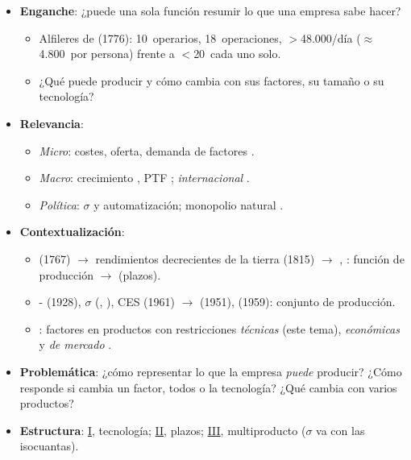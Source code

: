 \documentclass{article}
\begin{document}
\cabecerarepaso
\begin{columnas}

\begin{itemize}
\item \textbf{Enganche}: ¿puede una sola función resumir lo que una empresa sabe hacer?
  \begin{itemize}
  \item Alfileres de  (1776): 10~operarios, 18~operaciones, $>$48.000/día ($\approx$4.800~por persona) frente a $<$20~cada uno solo.
  \item ¿Qué puede producir y cómo cambia con sus factores, su tamaño o su tecnología?
  \end{itemize}
\item \textbf{Relevancia}:
  \begin{itemize}
  \item \emph{Micro}: costes, oferta, demanda de factores  .
  \item \emph{Macro}: crecimiento , PTF ; \emph{internacional}  .
  \item \emph{Política}: $\sigma$ y automatización; monopolio natural .
  \end{itemize}
\item \textbf{Contextualización}:
  \begin{itemize}
  \item {} (1767) $\to$ rendimientos decrecientes de la tierra (1815) $\to$ , : función de producción $\to$  (plazos).
  \item {}- (1928), $\sigma$ (, ), CES (1961) $\to$  (1951),  (1959): conjunto de producción.
  \item {}: factores en productos con restricciones \emph{técnicas} (este tema), \emph{económicas}  y \emph{de mercado} .
  \end{itemize}
\item \textbf{Problemática}: ¿cómo representar lo que la empresa \emph{puede} producir? ¿Cómo responde si cambia un factor, todos o la tecnología? ¿Qué cambia con varios productos?
\item \textbf{Estructura}: \hyperref[rep:I]{I}, tecnología; \hyperref[rep:II]{II}, plazos; \hyperref[rep:III]{III}, multiproducto ($\sigma$ va con las isocuantas).

\end{itemize}
\end{columnas}
\end{document}
